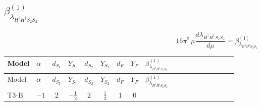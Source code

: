 \documentclass{article}
\begin{document}
\begin{landscape}
\section*{$\beta_{\lambda_{H^\dagger H^\dagger S_2 S_2}}^{(1)}$}
\[16\pi^2\,\mu\frac{d \lambda_{H^\dagger H^\dagger S_2 S_2}}{d\mu}=\beta_{\lambda_{H^\dagger H^\dagger S_2 S_2}}^{(1)}\]
\tiny
\begin{longtable}{@{}llcccccc >{\raggedright\arraybackslash}p{0.54\linewidth}@{}}
\toprule
Model & $\alpha$ & $d_{S_1}$ & $Y_{S_1}$ & $d_{S_2}$ & $Y_{S_2}$ & $d_F$ & $Y_F$ & $\beta_{\lambda_{H^\dagger H^\dagger S_2 S_2}}^{(1)}$ \\
\midrule
\endfirsthead
\toprule
Model & $\alpha$ & $d_{S_1}$ & $Y_{S_1}$ & $d_{S_2}$ & $Y_{S_2}$ & $d_F$ & $Y_F$ & $\beta_{\lambda_{H^\dagger H^\dagger S_2 S_2}}^{(1)}$ \\
\midrule
\endhead
T3-B & $-1$ & $2$ & $-\frac{1}{2}$ & $2$ & $\frac{1}{2}$ & $1$ & $0$ & \scriptsize\adjustbox{max width=\linewidth}{$\begin{gathered} {\lambda_{H^\dagger H^\dagger S_2 S_2}} (2 \operatorname{Tr}\!\left({y_2}\,\left({y_2}\right)^{\dagger}\right)+6 \operatorname{Tr}\!\left({Y_d}\,\left({Y_d}\right)^{\dagger}\right)+2 \operatorname{Tr}\!\left({Y_e}\,\left({Y_e}\right)^{\dagger}\right)+6 \operatorname{Tr}\!\left({Y_u}\,\left({Y_u}\right)^{\dagger}\right)) \\ +\left({\lambda_{T3}}\right)^{*} \operatorname{Tr}\!\left({y_1}\,\left({y_2}\right)^{\dagger}\right) \\ +4 {\lambda_{H^\dagger H^\dagger S_1^\dagger S_1^\dagger}} \left({\lambda_{S_1^{\dagger 2}S_2^{\dagger 2}}}\right)^{*} \\ +2 \left({\lambda_{T3}}\right)^{*} (\left({\lambda_{S_1^\dagger S_2 S_2^{\dagger 2}}}\right)^{*}-\left({\lambda_{H H^\dagger S_1^\dagger S_2^\dagger}^{\rm Cross}}\right)^{*}) \\ -9 {g_2}^2 {\lambda_{H^\dagger H^\dagger S_2 S_2}} \\ -3 {g_Y}^2 {\lambda_{H^\dagger H^\dagger S_2 S_2}} \\ +2 {\lambda_H} {\lambda_{H^\dagger H^\dagger S_2 S_2}} \\ +8 {\lambda_{H2}} {\lambda_{H^\dagger H^\dagger S_2 S_2}} \\ +4 {\lambda_{H2}^{\rm Adj}} {\lambda_{H^\dagger H^\dagger S_2 S_2}} \\ +2 {\lambda_{H^\dagger H^\dagger S_2 S_2}} {\lambda_{S_2}}\end{gathered}$} \\

\end{longtable}
\end{landscape}
\end{document}
